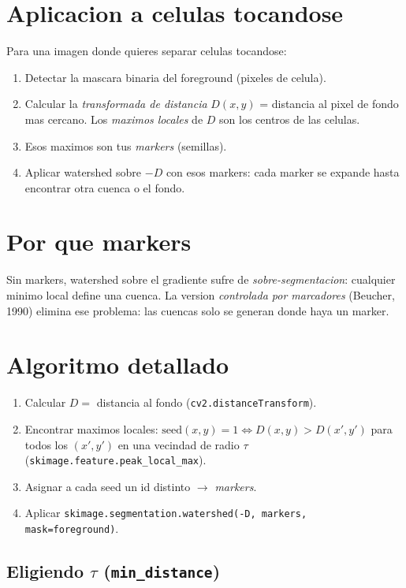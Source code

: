 \documentclass[11pt,a4paper,twoside,openright]{book}
\begin{document}
\section{Aplicacion a celulas tocandose}

Para una imagen donde quieres separar celulas tocandose:
\begin{enumerate}[leftmargin=2em]
  \item Detectar la mascara binaria del foreground (pixeles de celula).
  \item Calcular la \emph{transformada de distancia} $D(x,y)$ = distancia al pixel de fondo mas cercano. Los \emph{maximos locales} de $D$ son los centros de las celulas.
  \item Esos maximos son tus \emph{markers} (semillas).
  \item Aplicar watershed sobre $-D$ con esos markers: cada marker se expande hasta encontrar otra cuenca o el fondo.
\end{enumerate}

\section{Por que markers}

Sin markers, watershed sobre el gradiente sufre de \emph{sobre-segmentacion}: cualquier minimo local define una cuenca. La version \emph{controlada por marcadores} (Beucher, 1990) elimina ese problema: las cuencas solo se generan donde haya un marker.

\section{Algoritmo detallado}

\begin{enumerate}[leftmargin=2em]
  \item Calcular $D = $ distancia al fondo (\texttt{cv2.distanceTransform}).
  \item Encontrar maximos locales: $\mathrm{seed}(x,y) = 1 \iff D(x,y) > D(x',y')$ para todos los $(x',y')$ en una vecindad de radio $\tau$ (\texttt{skimage.feature.peak\_local\_max}).
  \item Asignar a cada seed un id distinto $\to$ \emph{markers}.
  \item Aplicar \texttt{skimage.segmentation.watershed(-D, markers, mask=foreground)}.
\end{enumerate}

\subsection{Eligiendo $\tau$ (\texttt{min\_distance})}
\end{document}

